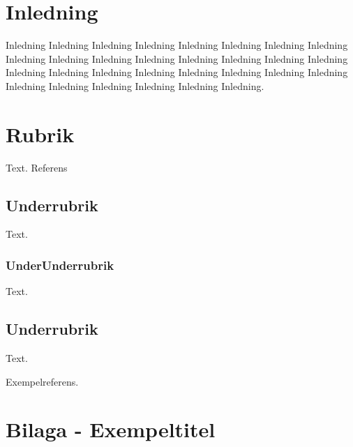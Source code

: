 \documentclass[10pt, titlepage, oneside, a4paper]{article}
\newcommand{\Section}[1]{\section{#1}\vspace{-8pt}}
\newcommand{\Subsection}[1]{\vspace{-4pt}\subsection{#1}\vspace{-8pt}}
\newcommand{\Subsubsection}[1]{\vspace{-4pt}\subsubsection{#1}\vspace{-8pt}}
\begin{document}
	\tableofcontents
	
	\newpage


	\setlength{\parindent}{0pt}
	\setlength{\parskip}{10pt}

	\Section{Inledning}		
	  	 
	  	 Inledning Inledning Inledning Inledning Inledning Inledning Inledning Inledning Inledning Inledning Inledning Inledning Inledning Inledning Inledning Inledning Inledning Inledning Inledning Inledning Inledning Inledning Inledning Inledning Inledning Inledning Inledning Inledning Inledning Inledning.
		
	\Section{Rubrik}
	
		Text. Referens \cite[sid. 122]{Ref1}

		\Subsection{Underrubrik}
				
			Text.

				\Subsubsection{UnderUnderrubrik}
				Text.
				
				\Subsection{Underrubrik}
				
				Text.
				
		
	\newpage
	
	\begin{thebibliography}{9}
		 Exempelreferens.
	\end{thebibliography}
	
	\newpage
		\appendix
	
		\Section{Bilaga - Exempeltitel}
\end{document}
